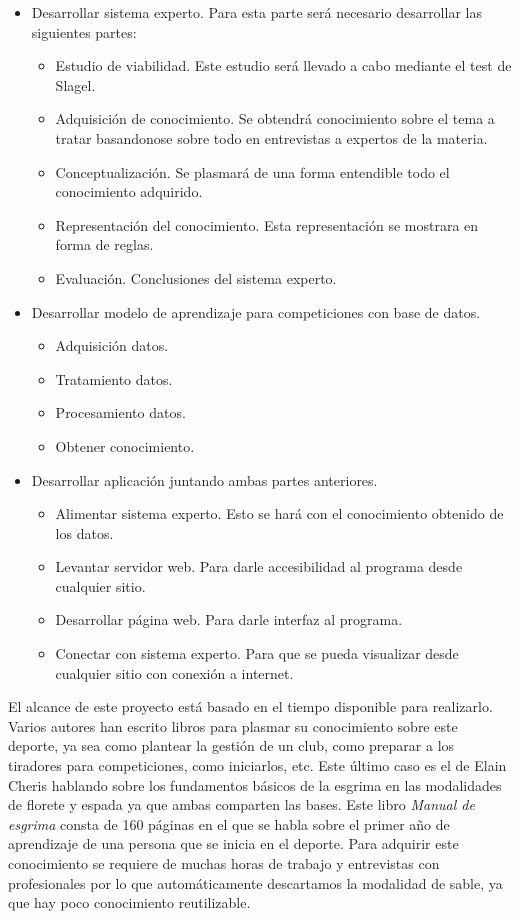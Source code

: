 \documentclass[11pt,a4paper,twoside,final]{article}
\begin{document}
\begin{itemize}
    \item Desarrollar sistema experto. Para esta parte será necesario desarrollar las siguientes partes:
    \begin{itemize}
        \item Estudio de viabilidad. Este estudio será llevado a cabo mediante el test de Slagel.
        \item Adquisición de conocimiento. Se obtendrá conocimiento sobre el tema a tratar basandonose sobre todo en entrevistas a expertos de la materia.
        \item Conceptualización. Se plasmará de una forma entendible todo el conocimiento adquirido.
        \item Representación del conocimiento. Esta representación se mostrara en forma de reglas.
        \item Evaluación. Conclusiones del sistema experto.
    \end{itemize}
    \item Desarrollar modelo de aprendizaje para competiciones con base de datos.
    \begin{itemize}
        \item Adquisición datos.
        \item Tratamiento datos.
        \item Procesamiento datos.
        \item Obtener conocimiento.
    \end{itemize}
    \item Desarrollar aplicación juntando ambas partes anteriores.
    \begin{itemize}
        \item Alimentar sistema experto. Esto se hará con el conocimiento obtenido de los datos.
        \item Levantar servidor web. Para darle accesibilidad al programa desde cualquier sitio.
        \item Desarrollar página web. Para darle interfaz al programa.
        \item Conectar con sistema experto. Para que se pueda visualizar desde cualquier sitio con conexión a internet.
    \end{itemize}
\end{itemize}

El alcance de este proyecto está basado en el tiempo disponible para realizarlo. Varios autores han escrito libros para plasmar su conocimiento sobre este deporte, ya sea como plantear la gestión de un club, como preparar a los tiradores para competiciones, como iniciarlos, etc. Este último caso es el de Elain Cheris hablando sobre los fundamentos básicos de la esgrima en las modalidades de florete y espada ya que ambas comparten las bases. Este libro \textit{Manual de esgrima} \cite{manualdeesgrima} consta de 160 páginas en el que se habla sobre el primer año de aprendizaje de una persona que se inicia en el deporte. Para adquirir este conocimiento se requiere de muchas horas de trabajo y entrevistas con profesionales por lo que automáticamente descartamos la modalidad de sable, ya que hay poco conocimiento reutilizable.
\end{document}
